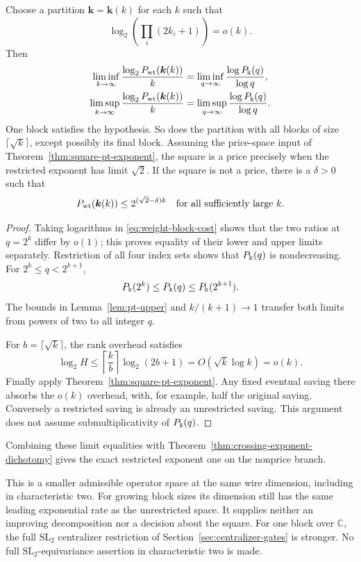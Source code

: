 \begin{corollary}
\label{cor:weight-block-square-gate}
Choose a partition \(\boldsymbol k=\boldsymbol k(k)\) for each \(k\)
such that
\[
 \log_2\!\left(\prod_i(2k_i+1)\right)=o(k).
\]
Then
\[
 \begin{split}
 \liminf_{k\to\infty}\frac{\log_2P_{\rm wt}(\boldsymbol k(k))}{k}
 &=\liminf_{q\to\infty}\frac{\log P_\Bbbk(q)}{\log q},\\
 \limsup_{k\to\infty}\frac{\log_2P_{\rm wt}(\boldsymbol k(k))}{k}
 &=\limsup_{q\to\infty}\frac{\log P_\Bbbk(q)}{\log q}.
 \end{split}
\]
One block satisfies the hypothesis. So does the partition with all
blocks of size \(\lceil\sqrt k\rceil\), except possibly its final block.
Assuming the price-space input of
Theorem~\ref{thm:square-pt-exponent}, the square is a price precisely
when the restricted exponent has limit \(\sqrt2\).
If the square is not a price, there is a \(\delta>0\) such that
\[
 P_{\rm wt}(\boldsymbol k(k))
 \leq2^{(\sqrt2-\delta)k}
 \quad\text{for all sufficiently large }k.
\]
\end{corollary}
\begin{proof}
Taking logarithms in \eqref{eq:weight-block-cost} shows that the two
ratios at \(q=2^k\) differ by \(o(1)\); this proves equality of their
lower and upper limits separately.
Restriction of all four index sets shows that \(P_\Bbbk(q)\) is
nondecreasing. For \(2^k\leq q<2^{k+1}\),
\[
 P_\Bbbk(2^k)\leq P_\Bbbk(q)\leq P_\Bbbk(2^{k+1}).
\]
The bounds in Lemma~\ref{lem:pt-upper} and \(k/(k+1)\to1\) transfer
both limits from powers of two to all integer \(q\).

For \(b=\lceil\sqrt k\rceil\), the rank overhead satisfies
\[
 \log_2 H\leq
 \left\lceil\frac{k}{b}\right\rceil\log_2(2b+1)
 =O(\sqrt k\log k)=o(k).
\]
Finally apply Theorem~\ref{thm:square-pt-exponent}. Any fixed eventual
saving there absorbs the \(o(k)\) overhead, with, for example, half
the original saving. Conversely a restricted saving is already an
unrestricted saving. This argument does not assume
submultiplicativity of \(P_\Bbbk(q)\).
\end{proof}

Combining these limit equalities with
Theorem~\ref{thm:crossing-exponent-dichotomy} gives the exact restricted
exponent one on the nonprice branch.

This is a smaller admissible operator space at the same wire dimension,
including in characteristic two. For growing block sizes its dimension
still has the same leading exponential rate as the unrestricted space.
It supplies neither an improving decomposition nor a decision about the
square. For one block over \(\mathbb C\), the full
\(\mathrm{SL}_2\) centralizer restriction of
Section~\ref{sec:centralizer-gates} is stronger. No full
\(\mathrm{SL}_2\)-equivariance assertion in characteristic two is made.
